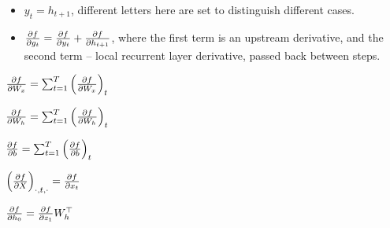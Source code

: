 \documentclass[12pt]{article}
\begin{document}
\begin{itemize}

\item $y_t = h_{t+1}$, different letters here are set to distinguish different cases.
\item $\pdv{f}{g_t} = \pdv{f}{y_t} + \pdv{f}{h_{t+1}}$, where the first term is an upstream derivative, and the second term -- local recurrent layer derivative, passed back between steps.

\end{itemize}

$\pdv{f}{W_x} = \sum_{t=1}^{T} \pdv{f}{W_x}_t$

$\pdv{f}{W_h} = \sum_{t=1}^{T} \pdv{f}{W_h}_t$

$\pdv{f}{b} = \sum_{t=1}^{T} \pdv{f}{b}_t$

$\pdv{f}{X}_{\cdot, t, \cdot} = \pdv{f}{x_t}$

$\pdv{f}{h_0} = \pdv{f}{z_1} W_h^\top$
\end{document}
